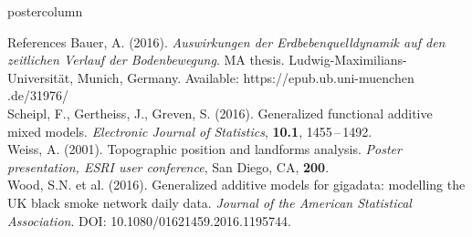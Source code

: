 \documentclass[final,hyperref={pdfpagelabels=false}]{beamer}
\begin{document}
\begin{frame}
\begin{columns}
\begin{column}{1\textwidth}
\vspace{2ex}
\begin{beamercolorbox}[center,wd=\textwidth]{postercolumn}
\begin{minipage}[T]{.95\textwidth}  %
\begin{block}{\footnotesize References}
{\footnotesize %
Bauer, A. (2016). \textit{Auswirkungen der Erdbebenquelldynamik auf den zeitlich\-en Verlauf der Bodenbewegung}. MA thesis. Ludwig-Maximilians-Uni\-versi\-t\"{a}t, Munich, Germany. Available: https://epub.ub.uni-muenchen .de/31976/ \\
Scheipl, F., Gertheiss, J., Greven, S. (2016). Generalized functional additive mixed models. \textit{Electronic Journal of Statistics}, \textbf{10.1}, 1455\,--\,1492. \\
Weiss, A. (2001). Topographic position and landforms analysis. \textit{Poster presentation, ESRI user conference}, San Diego, CA, \textbf{200}. \\
Wood, S.N. et al. (2016). Generalized additive models for gigadata: modelling the UK black smoke network daily data. \textit{Journal of the American Statistical Association}. DOI: 10.1080/01621459.2016.1195744.
} %
\end{block}
\end{minipage}
\end{beamercolorbox}

\end{column} %
\end{columns}
\end{frame}
\end{document}
